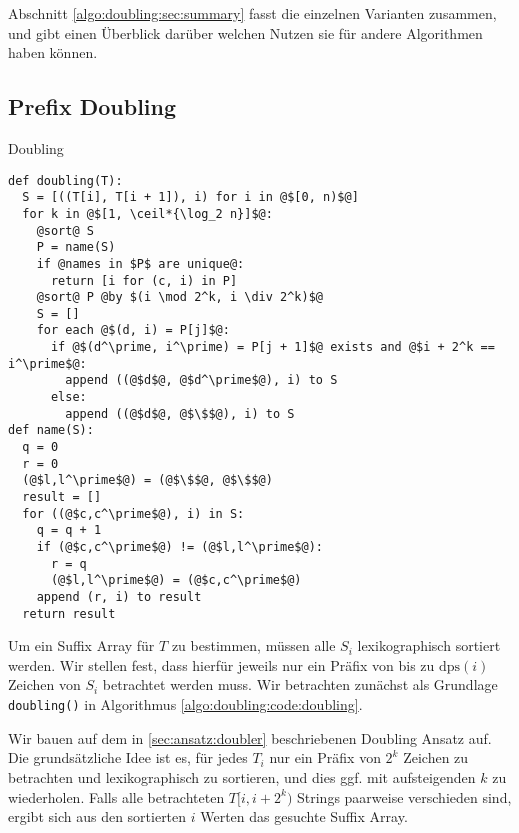 Abschnitt \ref{algo:doubling:sec:summary} fasst die einzelnen Varianten zusammen, und gibt einen Überblick darüber welchen Nutzen sie für andere Algorithmen haben können.

\subsection{Prefix Doubling}
\label{algo:doubling:sec:doubling}
\begin{listing}[htp]
\caption{Doubling} 
\label{algo:doubling:code:doubling}
\begin{verbatim}
def doubling(T):
  S = [((T[i], T[i + 1]), i) for i in @$[0, n)$@]
  for k in @$[1, \ceil*{\log_2 n}]$@:
    @sort@ S
    P = name(S)
    if @names in $P$ are unique@:
      return [i for (c, i) in P]
    @sort@ P @by $(i \mod 2^k, i \div 2^k)$@
    S = []
    for each @$(d, i) = P[j]$@:
      if @$(d^\prime, i^\prime) = P[j + 1]$@ exists and @$i + 2^k == i^\prime$@:
        append ((@$d$@, @$d^\prime$@), i) to S
      else:
        append ((@$d$@, @$\$$@), i) to S
def name(S):
  q = 0
  r = 0
  (@$l,l^\prime$@) = (@$\$$@, @$\$$@)
  result = []
  for ((@$c,c^\prime$@), i) in S:
    q = q + 1
    if (@$c,c^\prime$@) != (@$l,l^\prime$@):
      r = q
      (@$l,l^\prime$@) = (@$c,c^\prime$@)
    append (r, i) to result
  return result
\end{verbatim}
\end{listing}

Um ein Suffix Array für $T$ zu bestimmen, müssen alle $S_i$ lexikographisch sortiert werden. Wir stellen fest, dass hierfür jeweils nur ein Präfix von bis zu $\text{dps}(i)$ Zeichen von $S_i$ betrachtet werden muss. Wir betrachten zunächst als Grundlage \texttt{doubling()} in Algorithmus \ref{algo:doubling:code:doubling}.

Wir bauen auf dem in \cref{sec:ansatz:doubler} beschriebenen Doubling Ansatz auf. Die grundsätzliche Idee ist es, für jedes $T_i$ nur ein Präfix von $2^k$ Zeichen zu betrachten und lexikographisch zu sortieren, und dies ggf. mit aufsteigenden $k$ zu wiederholen. Falls alle betrachteten $T[i, i + 2^k)$ Strings paarweise verschieden sind, ergibt sich aus den sortierten $i$ Werten das gesuchte Suffix Array. 


